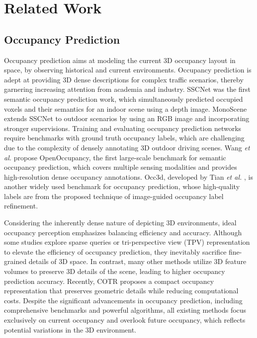 \section{Related Work}

\vspace{-5pt}
\subsection{Occupancy Prediction}
\vspace{-5pt}

Occupancy prediction aims at modeling the current 3D occupancy layout in space, by observing historical and current environments. Occupancy prediction is adept at providing 3D dense descriptions for complex traffic scenarios, thereby garnering increasing attention from academia and industry. SSCNet \citep{sscnet} was the first semantic occupancy prediction work, which simultaneously predicted occupied voxels and their semantics for an indoor scene using a depth image. MonoScene \citep{monoscene} extends SSCNet to outdoor scenarios by using an RGB image and incorporating stronger supervisions. Training and evaluating occupancy prediction networks require benchmarks with ground truth occupancy labels, which are challenging due to the complexity of densely annotating 3D outdoor driving scenes. Wang \textit{et al.} \citep{openoccupancy} propose OpenOccupancy, the first large-scale benchmark for semantic occupancy prediction, which covers multiple sensing modalities and provides high-resolution dense occupancy annotations. Occ3d, developed by Tian \textit{et al.} \citep{occ3d}, is another widely used benchmark for occupancy prediction, whose high-quality labels are from the proposed technique of image-guided occupancy label refinement.

Considering the inherently dense nature of depicting 3D environments, ideal occupancy perception emphasizes balancing efficiency and accuracy. Although some studies explore sparse queries \citep{voxformer} or tri-perspective view (TPV) representation \citep{tpvformer} to elevate the efficiency of occupancy prediction, they inevitably sacrifice fine-grained details of 3D space. In contrast, many other methods \citep{occformer,surroundocc,cotr} utilize 3D feature volumes to preserve 3D details of the scene, leading to higher occupancy prediction accuracy. Recently, COTR \citep{cotr} proposes a compact occupancy representation that preserves geometric details while reducing computational costs. Despite the significant advancements in occupancy prediction, including comprehensive benchmarks and powerful algorithms, all existing methods focus exclusively on current occupancy and overlook future occupancy, which reflects potential variations in the 3D environment.

